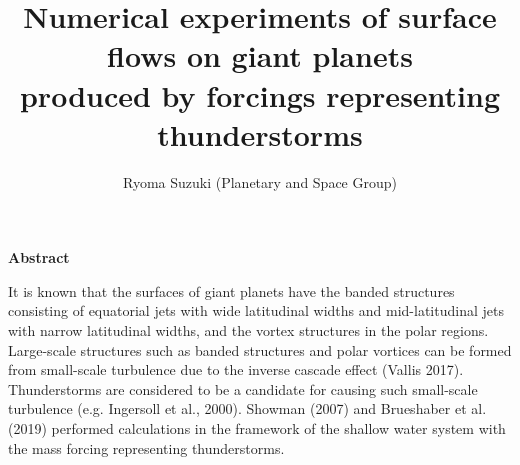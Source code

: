\documentclass[a4j,8pt]{jarticle}
\begin{document}
\pagestyle{empty} 
\title{\Large 
Numerical experiments of surface flows on giant planets \\
produced by forcings representing thunderstorms
}

\author{\large Ryoma Suzuki (Planetary and Space Group)}
\date{}
\maketitle
\begin{center}
\bf \large Abstract
\end{center}
%
It is known that the surfaces of giant planets have
the banded structures consisting of equatorial jets with wide latitudinal widths
and mid-latitudinal jets with narrow latitudinal widths, and
the vortex structures in the polar regions.
%
Large-scale structures such as banded structures and polar vortices
can be formed from small-scale turbulence due to the inverse cascade effect (Vallis 2017).
Thunderstorms are considered to be
a candidate for causing such small-scale turbulence (e.g. Ingersoll et al., 2000).
%
Showman (2007) and Brueshaber et al. (2019) performed calculations 
in the framework of the shallow water system
with the mass forcing representing thunderstorms.
\end{document}

